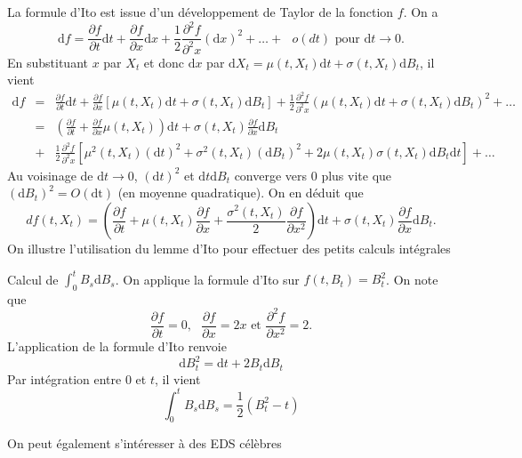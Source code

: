 La formule d'Ito est issue d'un développement de Taylor de la fonction $f$. On a 
$$
\text{d}f = \frac{\partial f}{\partial t}\text{d}t + \frac{\partial f}{\partial x}\text{d}x + \frac{1}{2}\frac{\partial^2 f}{\partial^2 x}(\text{d}x)^2+\ldots +\text{ }o(dt)\text{ pour }\text{d}t\rightarrow 0.
$$
En substituant $x$ par $X_t$ et donc $\text{d}x$ par $\text{d} X_t = \mu(t,X_t)\text{d}t + \sigma(t,X_t)\text{d}B_t$, il vient
\begin{eqnarray*}
\text{d}f & =& \frac{\partial f}{\partial t}\text{d}t + \frac{\partial f}{\partial x}\left[\mu(t,X_t)\text{d}t + \sigma(t,X_t)\text{d}B_t\right] + \frac{1}{2}\frac{\partial^2 f}{\partial^2 x}(\mu(t,X_t)\text{d}t + \sigma(t,X_t)\text{d}B_t)^2+\ldots\\
&=& \left(\frac{\partial f}{\partial t} + \frac{\partial f}{\partial x}\mu(t,X_t)\right)\text{d}t 
+ \sigma(t,X_t)\frac{\partial f}{\partial x}\text{d}B_t\\
 &+& \frac{1}{2}\frac{\partial^2 f}{\partial^2 x}\left[\mu^2(t,X_t)(\text{d}t)^2 + \sigma^2(t,X_t)(\text{d}B_t)^2 + 2 \mu(t,X_t)\sigma(t,X_t)\text{d}B_t\text{d}t  \right]+\ldots
\end{eqnarray*}
Au voisinage de $\text{d}t\rightarrow0$, $(\text{d}t)^2$ et $\text{d}t\text{d}B_t$ converge vers $0$ plus vite que $(\text{d}B_t)^2 = O(\text{dt})$ (en moyenne quadratique). On en déduit que 
$$
df(t,X_t) = \left(\frac{\partial f}{\partial t} + \mu(t,X_t)\frac{\partial f}{\partial x}+\frac{\sigma^2(t,X_t)}{2}\frac{\partial f}{\partial x^2}\right)\text{d}t + \sigma(t,X_t)\frac{\partial f}{\partial x}\text{d}B_t.
$$
On illustre l'utilisation du lemme d'Ito pour effectuer des petits calculs intégrales
\begin{ex}
Calcul de $\int_0^tB_s\text{d}B_s$. On applique la formule d'Ito sur $f(t, B_t) = B_t^2$. On note que 
	$$
	\frac{\partial f}{\partial t} = 0,\text{ }\frac{\partial f}{\partial x} = 2x\text{ et }\frac{\partial^2 f}{\partial x^2} = 2.
	$$
	L'application de la formule d'Ito renvoie
	$$
	\text{d}B_t^2 = \text{d}t + 2B_t\text{d}B_t
	$$
	Par intégration entre $0$ et $t$, il vient
	$$
	\int_0^tB_s\text{d}B_s = \frac{1}{2}\left(B_t^2-t\right)
	$$

\end{ex}
On peut également s'intéresser à des EDS célèbres
